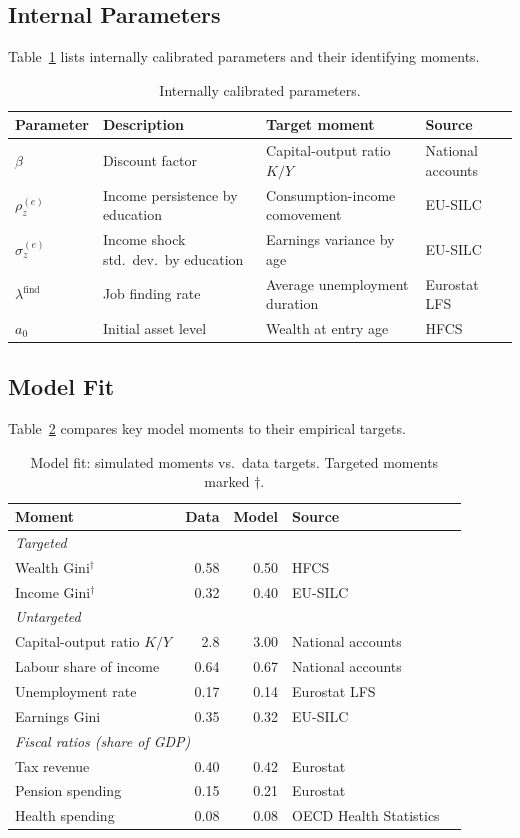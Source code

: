 \subsection{Internal Parameters}

Table~\ref{tab:internal} lists internally calibrated parameters and their identifying moments.

\begin{table}[H]
\centering
\small
\caption{Internally calibrated parameters.}
\label{tab:internal}
\begin{tabular}{llll}
\toprule
Parameter & Description & Target moment & Source \\
\midrule
$\beta$ & Discount factor & Capital-output ratio $K/Y$ & National accounts \\
$\rho_z^{(e)}$ & Income persistence by education & Consumption-income comovement & EU-SILC \\
$\sigma_z^{(e)}$ & Income shock std.\ dev.\ by education & Earnings variance by age & EU-SILC \\
$\lambda^{\text{find}}$ & Job finding rate & Average unemployment duration & Eurostat LFS \\
$a_0$ & Initial asset level & Wealth at entry age & HFCS \\
\bottomrule
\end{tabular}
\end{table}

\subsection{Model Fit}

Table~\ref{tab:fit} compares key model moments to their empirical targets.

\begin{table}[H]
\centering
\small
\caption{Model fit: simulated moments vs.\ data targets. Targeted moments marked $\dagger$.}
\label{tab:fit}
\begin{tabular}{lrrll}
\toprule
Moment & Data & Model & Source \\
\midrule
\multicolumn{4}{l}{\textit{Targeted}} \\
Wealth Gini$^\dagger$ & 0.58 & 0.50 & HFCS \\
Income Gini$^\dagger$ & 0.32 & 0.40 & EU-SILC \\
\midrule
\multicolumn{4}{l}{\textit{Untargeted}} \\
Capital-output ratio $K/Y$ & 2.8 & 3.00 & National accounts \\
Labour share of income & 0.64 & 0.67 & National accounts \\
Unemployment rate & 0.17 & 0.14 & Eurostat LFS \\
Earnings Gini & 0.35 & 0.32 & EU-SILC \\
\midrule
\multicolumn{4}{l}{\textit{Fiscal ratios (share of GDP)}} \\
Tax revenue & 0.40 & 0.42 & Eurostat \\
Pension spending & 0.15 & 0.21 & Eurostat \\
Health spending & 0.08 & 0.08 & OECD Health Statistics \\
\bottomrule
\end{tabular}
\end{table}
